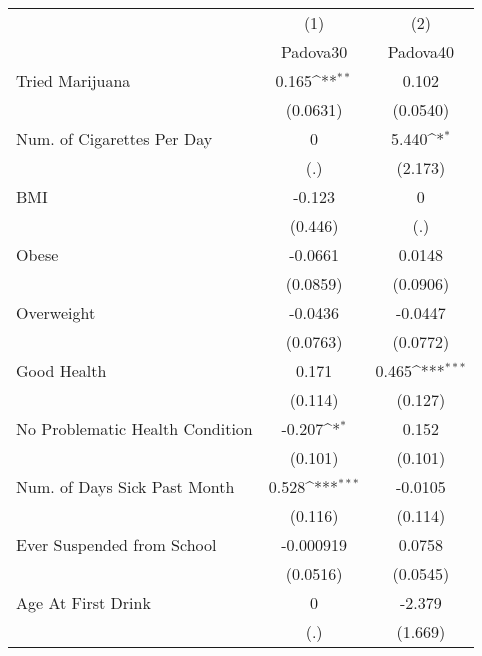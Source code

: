 {
\def\sym#1{\ifmmode^{#1}\else\(^{#1}\)\fi}
\begin{tabular}{l*{2}{c}}
\toprule
            &\multicolumn{1}{c}{(1)}&\multicolumn{1}{c}{(2)}\\
            &\multicolumn{1}{c}{Padova30}&\multicolumn{1}{c}{Padova40}\\
\midrule
Tried Marijuana&       0.165\sym{**} &       0.102         \\
            &    (0.0631)         &    (0.0540)         \\
\addlinespace
Num. of Cigarettes Per Day&           0         &       5.440\sym{*}  \\
            &         (.)         &     (2.173)         \\
\addlinespace
BMI         &      -0.123         &           0         \\
            &     (0.446)         &         (.)         \\
\addlinespace
Obese       &     -0.0661         &      0.0148         \\
            &    (0.0859)         &    (0.0906)         \\
\addlinespace
Overweight  &     -0.0436         &     -0.0447         \\
            &    (0.0763)         &    (0.0772)         \\
\addlinespace
Good Health &       0.171         &       0.465\sym{***}\\
            &     (0.114)         &     (0.127)         \\
\addlinespace
No Problematic Health Condition&      -0.207\sym{*}  &       0.152         \\
            &     (0.101)         &     (0.101)         \\
\addlinespace
Num. of Days Sick Past Month&       0.528\sym{***}&     -0.0105         \\
            &     (0.116)         &     (0.114)         \\
\addlinespace
Ever Suspended from School&   -0.000919         &      0.0758         \\
            &    (0.0516)         &    (0.0545)         \\
\addlinespace
Age At First Drink&           0         &      -2.379         \\
            &         (.)         &     (1.669)         \\
\bottomrule
\end{tabular}
}
